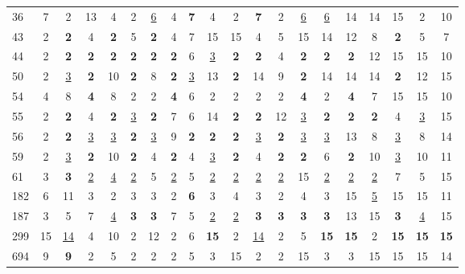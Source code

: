 \begin{tabular}{l c c c c c c c c c c c c c c c c c c c }
36 & 7 & 2 & 13 & 4 & 2 & \underline{6} & 4 & \textbf{7} & 4 & 2 & \textbf{7} & 2 & \underline{6} & \underline{6} & 14 & 14 & 15 & 2 & 10 \\
43 & 2 & \textbf{2} & 4 & \textbf{2} & 5 & \textbf{2} & 4 & 7 & 15 & 15 & 4 & 5 & 15 & 14 & 12 & 8 & \textbf{2} & 5 & 7 \\
44 & 2 & \textbf{2} & \textbf{2} & \textbf{2} & \textbf{2} & \textbf{2} & \textbf{2} & 6 & \underline{3} & \textbf{2} & \textbf{2} & 4 & \textbf{2} & \textbf{2} & \textbf{2} & 12 & 15 & 15 & 10 \\
50 & 2 & \underline{3} & \textbf{2} & 10 & \textbf{2} & 8 & \textbf{2} & \underline{3} & 13 & \textbf{2} & 14 & 9 & \textbf{2} & 14 & 14 & 14 & \textbf{2} & 12 & 15 \\
54 & 4 & 8 & \textbf{4} & 8 & 2 & 2 & \textbf{4} & 6 & 2 & 2 & 2 & 2 & \textbf{4} & 2 & \textbf{4} & 7 & 15 & 15 & 10 \\
55 & 2 & \textbf{2} & 4 & \textbf{2} & \underline{3} & \textbf{2} & 7 & 6 & 14 & \textbf{2} & \textbf{2} & 12 & \underline{3} & \textbf{2} & \textbf{2} & \textbf{2} & 4 & \underline{3} & 15 \\
56 & 2 & \textbf{2} & \underline{3} & \underline{3} & \textbf{2} & \underline{3} & 9 & \textbf{2} & \textbf{2} & \textbf{2} & \underline{3} & \textbf{2} & \underline{3} & \underline{3} & 13 & 8 & \underline{3} & 8 & 14 \\
59 & 2 & \underline{3} & \textbf{2} & 10 & \textbf{2} & 4 & \textbf{2} & 4 & \underline{3} & \textbf{2} & 4 & \textbf{2} & \textbf{2} & 6 & \textbf{2} & 10 & \underline{3} & 10 & 11 \\
61 & 3 & \textbf{3} & \underline{2} & \underline{4} & \underline{2} & 5 & \underline{2} & 5 & \underline{2} & \underline{2} & \underline{2} & \underline{2} & 15 & \underline{2} & \underline{2} & \underline{2} & 7 & 5 & 15 \\
182 & 6 & 11 & 3 & 2 & 3 & 3 & 2 & \textbf{6} & 3 & 4 & 3 & 2 & 4 & 3 & 15 & \underline{5} & 15 & 15 & 11 \\
187 & 3 & 5 & 7 & \underline{4} & \textbf{3} & \textbf{3} & 7 & 5 & \underline{2} & \underline{2} & \textbf{3} & \textbf{3} & \textbf{3} & \textbf{3} & 13 & 15 & \textbf{3} & \underline{4} & 15 \\
299 & 15 & \underline{14} & 4 & 10 & 2 & 12 & 2 & 6 & \textbf{15} & 2 & \underline{14} & 2 & 5 & \textbf{15} & \textbf{15} & 2 & \textbf{15} & \textbf{15} & \textbf{15} \\
694 & 9 & \textbf{9} & 2 & 5 & 2 & 2 & 2 & 5 & 3 & 15 & 2 & 2 & 15 & 3 & 3 & 15 & 15 & 15 & 14 \\

\end{tabular}
